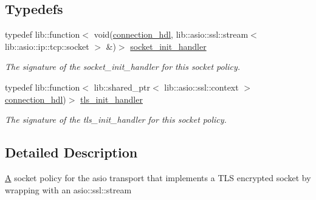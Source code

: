 \subsection*{Typedefs}
\begin{DoxyCompactItemize}
\item 
\mbox{\label{namespacewebsocketpp_1_1transport_1_1asio_1_1tls__socket_a0ec24de8bf054a4bc6f6c018e743efea}} 
typedef lib\+::function$<$ void(\mbox{\hyperlink{namespacewebsocketpp_a6b3d26a10ee7229b84b776786332631d}{connection\+\_\+hdl}}, lib\+::asio\+::ssl\+::stream$<$ lib\+::asio\+::ip\+::tcp\+::socket $>$ \&)$>$ \mbox{\hyperlink{namespacewebsocketpp_1_1transport_1_1asio_1_1tls__socket_a0ec24de8bf054a4bc6f6c018e743efea}{socket\+\_\+init\+\_\+handler}}
\begin{DoxyCompactList}\small\item\em The signature of the socket\+\_\+init\+\_\+handler for this socket policy. \end{DoxyCompactList}\item 
\mbox{\label{namespacewebsocketpp_1_1transport_1_1asio_1_1tls__socket_a6fe279813cc19b05a3897d20f10f16d2}} 
typedef lib\+::function$<$ lib\+::shared\+\_\+ptr$<$ lib\+::asio\+::ssl\+::context $>$\mbox{\hyperlink{namespacewebsocketpp_a6b3d26a10ee7229b84b776786332631d}{connection\+\_\+hdl}})$>$ \mbox{\hyperlink{namespacewebsocketpp_1_1transport_1_1asio_1_1tls__socket_a6fe279813cc19b05a3897d20f10f16d2}{tls\+\_\+init\+\_\+handler}}
\begin{DoxyCompactList}\small\item\em The signature of the tls\+\_\+init\+\_\+handler for this socket policy. \end{DoxyCompactList}\end{DoxyCompactItemize}


\subsection{Detailed Description}
\mbox{\hyperlink{struct_a}{A}} socket policy for the asio transport that implements a T\+LS encrypted socket by wrapping with an asio\+::ssl\+::stream 